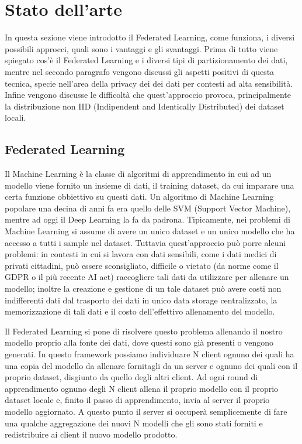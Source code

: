 \chapter{Stato dell'arte}
In questa sezione viene introdotto il Federated Learning, come funziona,
i diversi possibili approcci, quali sono i vantaggi e gli svantaggi.
Prima di tutto viene spiegato cos'è il Federated Learning e i diversi tipi
di partizionamento dei dati, mentre nel secondo paragrafo vengono discussi
gli aspetti positivi di questa tecnica, specie nell'area della privacy dei
dei dati per contesti ad alta sensibilità. Infine vengono discusse le
difficoltà che quest'approccio provoca, principalmente la distribuzione non
IID (Indipendent and Identically Distributed) dei dataset locali.

\section{Federated Learning}
Il Machine Learning è la classe di algoritmi di apprendimento in cui ad un
modello viene fornito un insieme di dati, il training dataset, da cui
imparare una certa funzione obbiettivo su questi dati. Un algoritmo di 
Machine Learning popolare una decina di anni fa era quello delle SVM
(Support Vector Machine), mentre ad oggi il Deep Learning la fa da padrona.
Tipicamente, nei problemi di Machine Learning si assume di avere un unico
dataset e un unico modello che ha accesso a tutti i sample nel dataset.
Tuttavia quest'approccio può porre alcuni problemi: in contesti in cui si
lavora con dati sensibili, come i dati medici di privati cittadini, può 
essere sconsigliato, difficile o vietato (da norme come il GDPR o il più
recente AI act) raccogliere tali dati da utilizzare per allenare un modello;
inoltre la creazione e gestione di un tale dataset può avere costi non
indifferenti dati dal trasporto dei dati in unico data storage centralizzato,
la memorizzazione di tali dati e il costo dell'effettivo allenamento del
modello.

Il Federated Learning si pone di risolvere questo problema allenando il nostro
modello proprio alla fonte dei dati, dove questi sono già presenti o vengono
generati. In questo framework possiamo individuare N client ognuno dei quali
ha una copia del modello da allenare fornitagli da un server e ognuno dei quali
con il proprio dataset, disgiunto da quello degli altri client.
Ad ogni round di apprendimento ognuno degli N client allena il proprio modello 
con il proprio dataset locale e, finito il passo di apprendimento, invia al
server il proprio modello aggiornato. A questo punto il server si occuperà 
semplicemente di fare una qualche aggregazione dei nuovi N modelli che gli sono
stati forniti e redistribuire ai client il nuovo modello prodotto.


